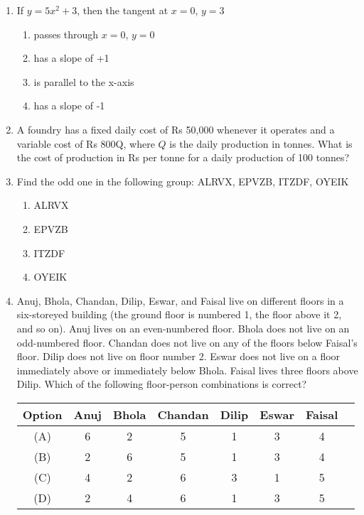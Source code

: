 \documentclass[journal,12pt,onecolumn]{IEEEtran}
\theoremstyle{remark}
\begin{document}
\begin{enumerate}
\item  If $y = 5x^2+ 3$, then the tangent at $x = 0$, $y = 3$

\begin{enumerate}
\item  passes through $x = 0$, $y = 0$
\item  has a slope of +1
\item  is parallel to the x-axis
\item  has a slope of -1
\end{enumerate}

\item 
A foundry has a fixed daily cost of Rs 50,000 whenever it operates and a variable cost of Rs 800Q, where $Q$ is the daily production in tonnes. What is the cost of production in Rs per tonne for a daily production of 100 tonnes?

\item Find the odd one in the following group: ALRVX, EPVZB, ITZDF, OYEIK

\begin{enumerate}
    \item ALRVX
    \item EPVZB
    \item ITZDF
    \item OYEIK
\end{enumerate}


\item Anuj, Bhola, Chandan, Dilip, Eswar, and Faisal live on different floors in a six-storeyed building (the ground floor is numbered 1, the floor above it 2, and so on). Anuj lives on an even-numbered floor. Bhola does not live on an odd-numbered floor. Chandan does not live on any of the floors below Faisal's floor. Dilip does not live on floor number 2. Eswar does not live on a floor immediately above or immediately below Bhola. Faisal lives three floors above Dilip. Which of the following floor-person combinations is correct?

\begin{center}
\begin{tabular}[12pt]{|c|c|c|c|c|c|c|c|}
\hline
Option & Anuj & Bhola & Chandan & Dilip & Eswar & Faisal \\
\hline
(A) & 6 & 2 & 5 & 1 & 3 & 4 \\
\hline
(B) & 2 & 6 & 5 & 1 & 3 & 4 \\
\hline
(C) & 4 & 2 & 6 & 3 & 1 & 5 \\
\hline
(D) & 2 & 4 & 6 & 1 & 3 & 5 \\
\hline
\end{tabular}
\end{center}







\end{enumerate}
\end{document}
